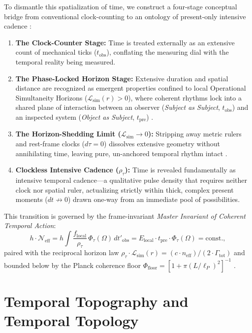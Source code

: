 \documentclass[11pt,a4paper]{article}
\theoremstyle{remark}
\begin{document}
To dismantle this spatialization of time, we construct a four-stage conceptual bridge from conventional clock-counting to an ontology of present-only intensive cadence \cite{damasio_p16,damasio_p17}:
\begin{enumerate}
    \item \textbf{The Clock-Counter Stage:} Time is treated externally as an extensive count of mechanical ticks ($t_{\mathrm{obs}}$), conflating the measuring dial with the temporal reality being measured.
    \item \textbf{The Phase-Locked Horizon Stage:} Extensive duration and spatial distance are recognized as emergent properties confined to local Operational Simultaneity Horizons ($\mathcal{L}_{\mathrm{sim}}(r) > 0$), where coherent rhythms lock into a shared plane of interaction between an observer (\emph{Subject as Subject}, $t_{\mathrm{obs}}$) and an inspected system (\emph{Object as Subject}, $t_{\mathrm{pre}}$) \cite{damasio_p15}.
    \item \textbf{The Horizon-Shedding Limit ($\mathcal{L}_{\mathrm{sim}} \to 0$):} Stripping away metric rulers and rest-frame clocks ($d\tau = 0$) dissolves extensive geometry without annihilating time, leaving pure, un-anchored temporal rhythm intact \cite{damasio_p17}.
    \item \textbf{Clockless Intensive Cadence ($\rho_\tau$):} Time is revealed fundamentally as intensive temporal cadence---a qualitative pulse density that requires neither clock nor spatial ruler, actualizing strictly within thick, complex present moments ($dt \not\to 0$) drawn one-way from an immediate pool of possibilities.
\end{enumerate}

This transition is governed by the frame-invariant \emph{Master Invariant of Coherent Temporal Action}:
\begin{equation}
h \cdot \mathcal{N}_{\mathrm{eff}} = h \int \frac{f_{\mathrm{local}}}{\rho_\tau} \, \Phi_\tau(\Omega) \, dt'_{\mathrm{obs}} = E_{\mathrm{local}} \cdot t_{\mathrm{pre}} \cdot \Phi_\tau(\Omega) = \mathrm{const.},
\end{equation}
paired with the reciprocal horizon law $\rho_\tau \cdot \mathcal{L}_{\mathrm{sim}}(r) = (c \cdot n_{\mathrm{eff}}) / (2 \cdot \Gamma_{\mathrm{tot}})$ and bounded below by the Planck coherence floor $\Phi_{\mathrm{floor}} = [1 + \pi(L/\ell_P)^2]^{-1}$ \cite{damasio_p16}.

\section{Temporal Topography and Temporal Topology}
\end{document}
